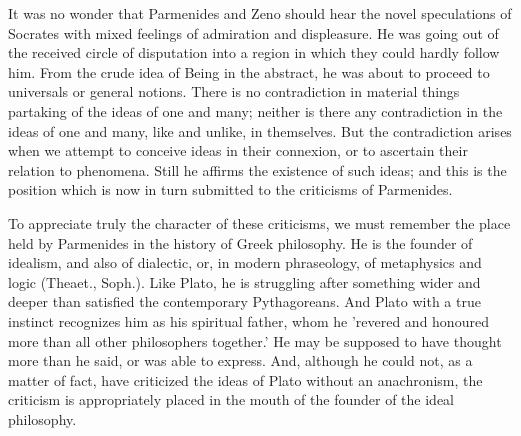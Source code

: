 \documentclass[11pt,letter]{article}
\begin{document}
\par  It was no wonder that Parmenides and Zeno should hear the novel speculations of Socrates with mixed feelings of admiration and displeasure. He was going out of the received circle of disputation into a region in which they could hardly follow him. From the crude idea of Being in the abstract, he was about to proceed to universals or general notions. There is no contradiction in material things partaking of the ideas of one and many; neither is there any contradiction in the ideas of one and many, like and unlike, in themselves. But the contradiction arises when we attempt to conceive ideas in their connexion, or to ascertain their relation to phenomena. Still he affirms the existence of such ideas; and this is the position which is now in turn submitted to the criticisms of Parmenides.

\par  To appreciate truly the character of these criticisms, we must remember the place held by Parmenides in the history of Greek philosophy. He is the founder of idealism, and also of dialectic, or, in modern phraseology, of metaphysics and logic (Theaet., Soph.). Like Plato, he is struggling after something wider and deeper than satisfied the contemporary Pythagoreans. And Plato with a true instinct recognizes him as his spiritual father, whom he 'revered and honoured more than all other philosophers together.' He may be supposed to have thought more than he said, or was able to express. And, although he could not, as a matter of fact, have criticized the ideas of Plato without an anachronism, the criticism is appropriately placed in the mouth of the founder of the ideal philosophy.
\end{document}
